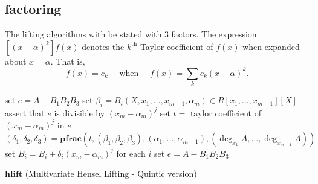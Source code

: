 \documentclass[11pt,reqno]{amsart}
\numberwithin{equation}{section}
\newcommand{\op}[1]  { \operatorname{ #1 }}
\begin{document}
\subsection{factoring}

The lifting algorithms with be stated with $3$ factors. The expression 
$[(x-\alpha)^k] f(x)$ denotes the $k^{\text{th}}$ Taylor coefficient of $f(x)$ 
when expanded about $x=\alpha$. That is,
\begin{equation*}
[(x-\alpha)^k] f(x) = c_k \quad \text{ when } \quad f(x) = \sum_{k} c_k 
(x-\alpha)^k\text{.}
\end{equation*}


\begin{algorithm}[H]
\DontPrintSemicolon
{}

set $e = A - B_1 B_2 B_3$ 
set $\beta_i = B_i(X, x_1, \dots, x_{m-1}, \alpha_m) \in R[x_1, \dots, 
x_{m-1}][X]$\;
\For{$j=1$ \KwTo $\op{deg}_{x_m}(A)$}
{
	assert that $e$ is divisible by $(x_m - \alpha_m)^j$\;
	set $t =$ taylor coefficient of $(x_m - \alpha_m)^j$ in $e$ 
	$(\delta_1, \delta_2, \delta_3) = \textbf{pfrac}(t, (\beta_1, \beta_2, 
\beta_3),(\alpha_1, \dots,\alpha_{m-1}), (\op{deg}_{x_1}A, \dots, 
\op{deg}_{x_{m-1}}A))$ \;
	set $B_i = B_i + \delta_i (x_m - \alpha_m)^j$ for each $i$\;
	set $e = A - B_1 B_2 B_3$
}
{
}
\caption{$\textbf{hlift}$ (Multivariate Hensel Lifting - Quintic version)}
\label{algo_mlift}
\end{algorithm}
\end{document}
